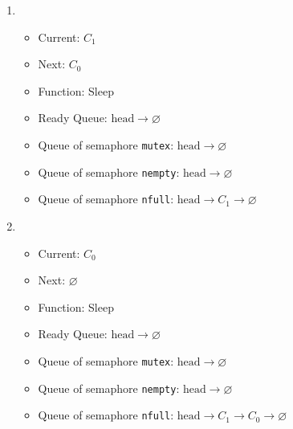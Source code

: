 \documentclass[11pt]{article}
\begin{document}
\begin{question}
\begin{enumerate}
{}
                \item {
                    \begin{itemize}
                        \item{Current: $C_{1}$}
                        \item{Next: $C_{0}$}
                        \item{Function: Sleep}
                        \item{
                            Ready Queue: $\text{head}\longrightarrow
                            \varnothing$
                        } \item{
                            Queue of semaphore {\tt mutex}: $\text{head}\longrightarrow
                            \varnothing$
                        }
                        \item{
                            Queue of semaphore {\tt nempty}: $\text{head}\longrightarrow
                            \varnothing$
                        }
                        \item{
                            Queue of semaphore {\tt nfull}: $\text{head}\longrightarrow
                            C_{1}\longrightarrow
                            \varnothing$
                        }
                \end{itemize}}
                \item{
                    \begin{itemize}
                        \item{Current: $C_{0}$}
                        \item{Next: $\varnothing$}
                        \item{Function: Sleep}
                        \item{
                            Ready Queue: $\text{head}\longrightarrow
                            \varnothing$
                        } \item{
                            Queue of semaphore {\tt mutex}: $\text{head}\longrightarrow
                            \varnothing$
                        }
                        \item{
                            Queue of semaphore {\tt nempty}: $\text{head}\longrightarrow
                            \varnothing$
                        }
                        \item{
                            Queue of semaphore {\tt nfull}: $\text{head}\longrightarrow
                            C_{1}\longrightarrow
                            C_{0}\longrightarrow
                            \varnothing$
                        }
                \end{itemize}}
        \end{enumerate}

    \end{question}
\end{document}
